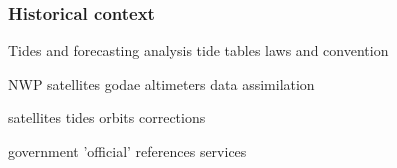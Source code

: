 \begin{frame}
\frametitle{Historical context}

Tides and forecasting
analysis 
tide tables
laws and convention


NWP
satellites
godae
altimeters
data assimilation


satellites
tides 
orbits
corrections


government
'official'
references
services


\end{frame}